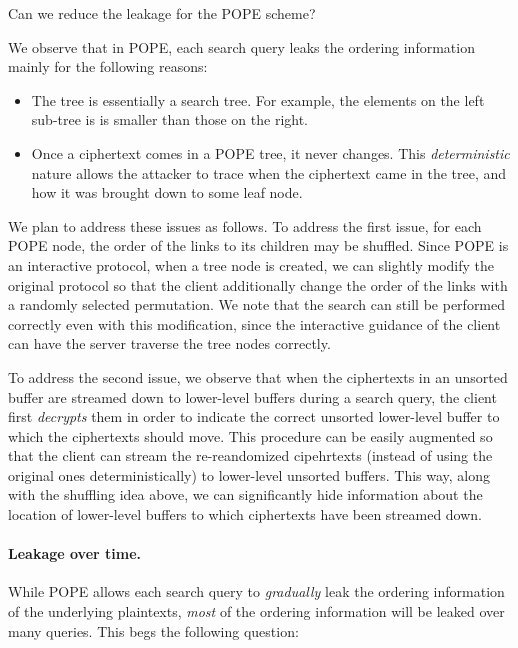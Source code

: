 \begin{question}
Can we reduce the leakage for the POPE scheme?
\end{question}

We observe that in POPE, each search query leaks the ordering information
mainly for the following reasons: 

\begin{itemize}
\item The tree is essentially a search tree. For example, the elements on the
  left sub-tree is is smaller than those on the right.
 
\item Once a ciphertext comes in a POPE tree, it never changes. This {\em
  deterministic} nature allows the attacker to trace when the ciphertext came
  in the tree, and how it was brought down to some leaf node.  
\end{itemize}

We plan to address these issues as follows. To address the first issue, for
each POPE node, the order of the links to its children may be shuffled. Since
POPE is an interactive protocol, when a tree node is created, we can slightly
modify the original protocol so that the client additionally change the order
of the links with a randomly selected permutation. 
%
We note that the search can still be performed correctly even with this
modification, since the interactive guidance of the client can have the server
traverse the tree nodes correctly. 
    
To address the second issue, we observe that when the ciphertexts in an
unsorted buffer are streamed down to lower-level buffers during a search query,
the client first {\em decrypts} them in order to indicate the correct unsorted
lower-level buffer to which the ciphertexts should move. This procedure can be
easily augmented so that the client can stream the {re-reandomized cipehrtexts}
(instead of using the original ones deterministically) to lower-level unsorted
buffers. This way, along with the shuffling idea above, we can significantly
hide information about the location of lower-level buffers to which ciphertexts
have been streamed down. 

\paragraph{Leakage over time.}
While POPE allows each search query to {\it gradually} leak the ordering
information of the underlying plaintexts, {\em most} of the ordering
information will be leaked over many queries. This begs the following question: 

